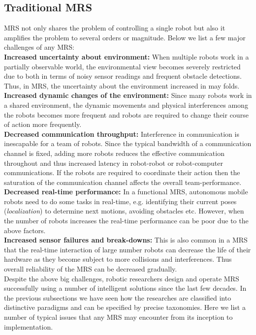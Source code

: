 \subsection{Traditional MRS}
\label{bg:mrs:mrs}
MRS not only shares the problem of controlling a single robot but also it amplifies the problem to several orders or magnitude. Below we list a few major challenges of any MRS:\\
\textbf{Increased uncertainty about environment:}
When multiple robots work in a partially observable world, the environmental view becomes severely restricted due to both in terms of noisy sensor readings and frequent obstacle detections. Thus, in MRS, the uncertainty about the environment increased in may folds.\\
\textbf{Increased dynamic changes of the environment:}
Since many robots work in a shared environment, the dynamic movements and physical interferences among the robots becomes more frequent and robots are required to change their course of action more frequently.\\
\textbf{Decreased communication throughput:}
Interference in communication is inescapable for a team of robots. Since the typical bandwidth of a communication channel is fixed, adding more robots reduces the effective communication throughout and thus increased latency in robot-robot or robot-computer communications. If the robots are required to coordinate their action then the saturation of the communication channel affects the overall team-performance.\\
\textbf{Decreased real-time performance:}
In a functional MRS, autonomous mobile robots need to do some tasks in real-time, e.g. identifying their current poses ({\em localization}) to determine next motions, avoiding obstacles etc. However, when the number of robots increases the real-time performance can be poor due to the above factors.\\
\textbf{Increased sensor failures and break-downs:}
This is also common in a MRS that the real-time interaction of large number robots can decrease the life of their hardware as they become subject to more collisions and interferences. Thus overall reliability of the MRS can be decreased gradually.\\
Despite the above big challenges, robotic researchers design and operate MRS successfully using a number of intelligent solutions since the last few decades. In the previous subsections we have seen how the researches are classified into distinctive paradigms and can be specified by precise taxonomies. Here we list a number of typical issues that any MRS may encounter from its inception to implementation.
